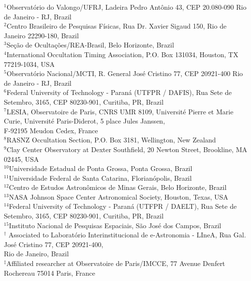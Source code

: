 {$^{1}$Observat\'orio do Valongo/UFRJ, Ladeira Pedro Ant\^onio 43,
CEP 20.080-090 Rio de Janeiro - RJ, Brazil\\
$^{2}$Centro Brasileiro de Pesquisas F\'isicas, Rua Dr. Xavier Sigaud 150, Rio de Janeiro  22290-180, Brazil\\
$^{3}$Se\c{c}\~ao de Oculta\c{c}\~oes/REA-Brasil, Belo Horizonte, Brazil\\
$^{4}$International Occultation Timing Association, P.O. Box 131034, Houston, TX 77219-1034, USA\\
$^{5}$Observat\'orio Nacional/MCTI, R. General Jos\'e Cristino 77, CEP 20921-400 Rio de Janeiro - RJ, Brazil\\
$^{6}$Federal University of Technology - Paran\'a (UTFPR / DAFIS), Rua Sete de Setembro, 3165, CEP 80230-901, Curitiba, PR, Brazil\\
$^{7}$LESIA, Observatoire de Paris, CNRS UMR 8109, Universit\'{e} Pierre et Marie Curie, Universit\'{e} Paris-Diderot, 5 place Jules Janssen,\\ F-92195 Meudon Cedex, France\\
$^{8}$RASNZ Occultation Section, P.O. Box 3181, Wellington, New Zealand\\
$^{9}$Clay Center Observatory at Dexter Southfield, 20 Newton Street, Brookline, MA 02445, USA\\
$^{10}$Universidade Estadual de Ponta Grossa, Ponta Grossa, Brazil\\
$^{11}$Universidade Federal de Santa Catarina, Florian\'opolis, Brazil\\
$^{12}$Centro de Estudos Astron\^omicos de Minas Gerais, Belo Horizonte, Brazil\\
$^{13}$NASA Johnson Space Center Astronomical Society, Houston, Texas, USA\\
$^{14}$Federal University of Technology - Paran\'a (UTFPR / DAELT), Rua Sete de Setembro, 3165, CEP 80230-901, Curitiba, PR, Brazil\\
$^{15}$Instituto Nacional de Pesquisas Espaciais, S\~ao Jos\'e dos Campos, Brazil\\
$^\dag$ Associated to Laborat\'{o}rio Interinstitucional de e-Astronomia - LIneA, Rua Gal. Jos\'e Cristino 77, CEP 20921-400,\\ Rio de Janeiro, Brazil\\
$^\ddag$Affiliated researcher at Observatoire de Paris/IMCCE, 77 Avenue Denfert Rochereau 75014 Paris, France



}{

}
